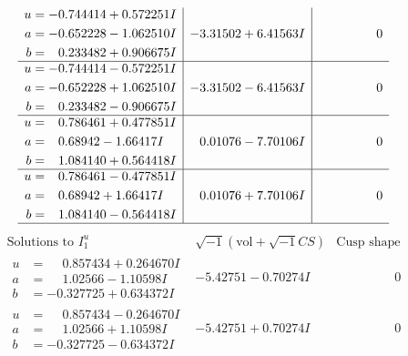 \documentclass[1p]{elsarticle_modified}
\theoremstyle{definition}
\newcommand{\I}{\sqrt{-1}}
\begin{document}
$$\begin{array}{c|c|c}
\begin{aligned}
u &= -0.744414 + 0.572251 I \\
a &= -0.652228 - 1.062510 I \\
b &= \phantom{-}0.233482 + 0.906675 I\end{aligned}
 & -3.31502 + 6.41563 I & \phantom{-0.000000 } 0 \\ \hline\begin{aligned}
u &= -0.744414 - 0.572251 I \\
a &= -0.652228 + 1.062510 I \\
b &= \phantom{-}0.233482 - 0.906675 I\end{aligned}
 & -3.31502 - 6.41563 I & \phantom{-0.000000 } 0 \\ \hline\begin{aligned}
u &= \phantom{-}0.786461 + 0.477851 I \\
a &= \phantom{-}0.68942 - 1.66417 I \\
b &= \phantom{-}1.084140 + 0.564418 I\end{aligned}
 & \phantom{-}0.01076 - 7.70106 I & \phantom{-0.000000 } 0 \\ \hline\begin{aligned}
u &= \phantom{-}0.786461 - 0.477851 I \\
a &= \phantom{-}0.68942 + 1.66417 I \\
b &= \phantom{-}1.084140 - 0.564418 I\end{aligned}
 & \phantom{-}0.01076 + 7.70106 I & \phantom{-0.000000 } 0\\
 \hline 
 \end{array}$$\newpage$$\begin{array}{c|c|c}  
\text{Solutions to }I^u_{1}& \I (\text{vol} + \sqrt{-1}CS) & \text{Cusp shape}\\
 \hline 
\begin{aligned}
u &= \phantom{-}0.857434 + 0.264670 I \\
a &= \phantom{-}1.02566 - 1.10598 I \\
b &= -0.327725 + 0.634372 I\end{aligned}
 & -5.42751 - 0.70274 I & \phantom{-0.000000 } 0 \\ \hline\begin{aligned}
u &= \phantom{-}0.857434 - 0.264670 I \\
a &= \phantom{-}1.02566 + 1.10598 I \\
b &= -0.327725 - 0.634372 I\end{aligned}
 & -5.42751 + 0.70274 I & \phantom{-0.000000 } 0 \\ \hline\begin{aligned}

\end{aligned}
\end{array}$$
\end{document}
